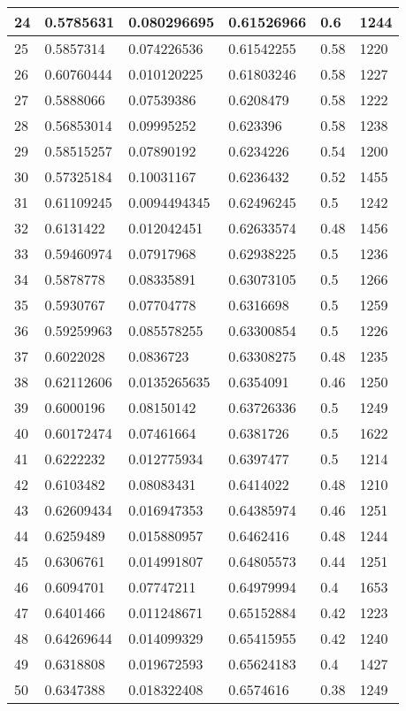 \begin{longtable}{|l|l|l|l|l|l|}
24 & 0.5785631 & 0.080296695 & 0.61526966 & 0.6 & 1244 \\ \hline 
25 & 0.5857314 & 0.074226536 & 0.61542255 & 0.58 & 1220 \\ \hline 
26 & 0.60760444 & 0.010120225 & 0.61803246 & 0.58 & 1227 \\ \hline 
27 & 0.5888066 & 0.07539386 & 0.6208479 & 0.58 & 1222 \\ \hline 
28 & 0.56853014 & 0.09995252 & 0.623396 & 0.58 & 1238 \\ \hline 
29 & 0.58515257 & 0.07890192 & 0.6234226 & 0.54 & 1200 \\ \hline 
30 & 0.57325184 & 0.10031167 & 0.6236432 & 0.52 & 1455 \\ \hline 
31 & 0.61109245 & 0.0094494345 & 0.62496245 & 0.5 & 1242 \\ \hline 
32 & 0.6131422 & 0.012042451 & 0.62633574 & 0.48 & 1456 \\ \hline 
33 & 0.59460974 & 0.07917968 & 0.62938225 & 0.5 & 1236 \\ \hline 
34 & 0.5878778 & 0.08335891 & 0.63073105 & 0.5 & 1266 \\ \hline 
35 & 0.5930767 & 0.07704778 & 0.6316698 & 0.5 & 1259 \\ \hline 
36 & 0.59259963 & 0.085578255 & 0.63300854 & 0.5 & 1226 \\ \hline 
37 & 0.6022028 & 0.0836723 & 0.63308275 & 0.48 & 1235 \\ \hline 
38 & 0.62112606 & 0.0135265635 & 0.6354091 & 0.46 & 1250 \\ \hline 
39 & 0.6000196 & 0.08150142 & 0.63726336 & 0.5 & 1249 \\ \hline 
40 & 0.60172474 & 0.07461664 & 0.6381726 & 0.5 & 1622 \\ \hline 
41 & 0.6222232 & 0.012775934 & 0.6397477 & 0.5 & 1214 \\ \hline 
42 & 0.6103482 & 0.08083431 & 0.6414022 & 0.48 & 1210 \\ \hline 
43 & 0.62609434 & 0.016947353 & 0.64385974 & 0.46 & 1251 \\ \hline 
44 & 0.6259489 & 0.015880957 & 0.6462416 & 0.48 & 1244 \\ \hline 
45 & 0.6306761 & 0.014991807 & 0.64805573 & 0.44 & 1251 \\ \hline 
46 & 0.6094701 & 0.07747211 & 0.64979994 & 0.4 & 1653 \\ \hline 
47 & 0.6401466 & 0.011248671 & 0.65152884 & 0.42 & 1223 \\ \hline 
48 & 0.64269644 & 0.014099329 & 0.65415955 & 0.42 & 1240 \\ \hline 
49 & 0.6318808 & 0.019672593 & 0.65624183 & 0.4 & 1427 \\ \hline 
50 & 0.6347388 & 0.018322408 & 0.6574616 & 0.38 & 1249 \\ \hline 
\end{longtable}